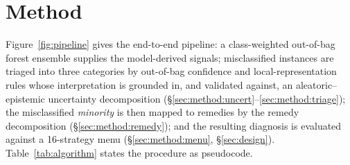 \section{Method}\label{sec:method}

Figure~\ref{fig:pipeline} gives the end-to-end pipeline: a class-weighted
out-of-bag forest ensemble supplies the model-derived signals; misclassified
instances are triaged into three categories by out-of-bag confidence and
local-representation rules whose interpretation is grounded in, and validated
against, an aleatoric--epistemic uncertainty decomposition
(\S\ref{sec:method:uncert}--\ref{sec:method:triage});
the misclassified \emph{minority} is then mapped to remedies by the remedy
decomposition (\S\ref{sec:method:remedy}); and the resulting diagnosis is
evaluated against a 16-strategy menu (\S\ref{sec:method:menu},
\S\ref{sec:design}). Table~\ref{tab:algorithm} states the procedure as
pseudocode.

